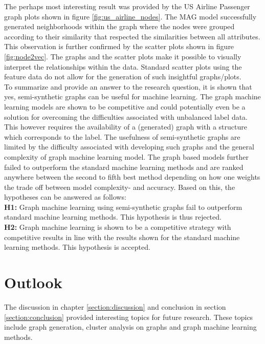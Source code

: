   \noindent The perhaps most interesting result was provided by the US Airline
  Passenger graph plots shown in figure \ref{fig:us_airline_nodes}. The MAG 
  model successfully generated neighborhoods within the graph where the nodes 
  were grouped according to their similarity that respected the similarities
  between all attributes. This observation is further confirmed by the scatter 
  plots shown in figure \ref{fig:node2vec}. The graphs and the scatter plots
  make it possible to visually interpret the relationships within the data. 
  Standard scatter plots using the feature data do not allow for the generation 
  of such insightful graphs/plots. \\

  \noindent To summarize and provide an answer to the research question, it is
  shown that yes, semi-synthetic graphs can be useful for machine learning. The
  graph machine learning models are shown to be competitive and could
  potentially even be a solution for overcoming the difficulties associated
  with unbalanced label data. This however requires the availability of a
  (generated) graph with a structure which corresponds to the label. The 
  usefulness of semi-synthetic graphs are limited by the difficulty associated 
  with developing such graphs and the general complexity of graph machine 
  learning model. The graph based models further failed to outperform the
  standard machine learning methods and are ranked anywhere between the second
  to fifth best method depending on how one weights the trade off between model
  complexity- and accuracy. Based on this, the hypotheses can be answered as
  follows: \\

  \noindent\textbf{H1:} Graph machine learning using semi-synthetic graphs fail
  to outperform standard machine learning methods. This hypothesis is thus
  rejected. \\

  \noindent\textbf{H2:} Graph machine learning is shown to be a competitive
  strategy with competitive results in line with the results shown for the
  standard machine learning methods. This hypothesis is accepted.

  \section{Outlook}

  The discussion in chapter \ref{section:discussion} and conclusion in section
  \ref{section:conclusion} provided interesting topics for future research.
  These topics include graph generation, cluster analysis on graphs and graph 
  machine learning methods. 

